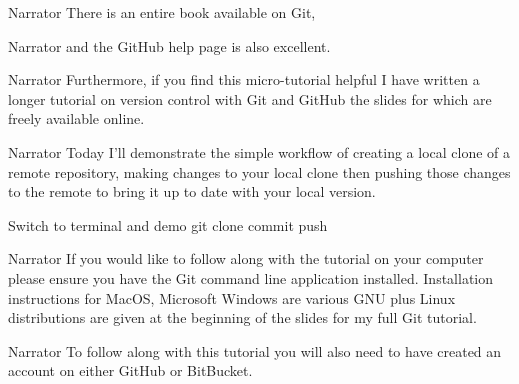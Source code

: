\documentclass{screenplay} %
\begin{document}
\begin{dialogue}{Narrator} 
There is an entire book available on Git,
\end{dialogue}

\begin{dialogue}{Narrator} 
and the GitHub help page is also excellent.
\end{dialogue}

\begin{dialogue}{Narrator} 
Furthermore, if you find this micro-tutorial helpful I have written a longer tutorial on version control with Git and GitHub the slides for which are freely available online.
\end{dialogue}

\begin{dialogue}{Narrator} 
Today I'll demonstrate the simple workflow of creating a local clone of a remote repository, making changes to your local clone then pushing those changes to the remote to bring it up to date with your local version.
\end{dialogue}

Switch to terminal and demo git clone commit push

\begin{dialogue}{Narrator} If you would like to follow along with the tutorial on your computer please ensure you have the Git command line application installed.  Installation instructions for MacOS, Microsoft Windows are various GNU plus Linux distributions are given at the beginning of the slides for my full Git tutorial.
\end{dialogue} 

\begin{dialogue}{Narrator}
To follow along with this tutorial you will also need to have created an account on either GitHub or BitBucket.
\end{dialogue}
\end{document}

